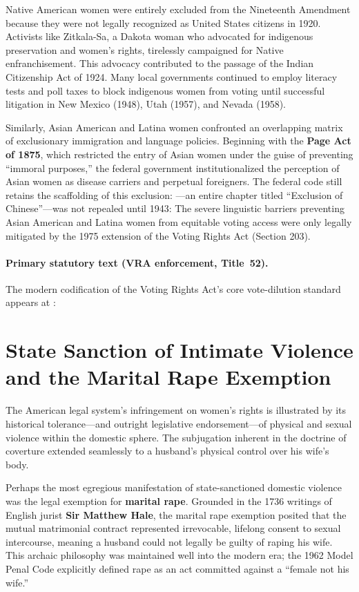 Native American women were entirely excluded from the Nineteenth Amendment because they were not legally recognized as United States citizens in 1920. Activists like Zitkala-Sa, a Dakota woman who advocated for indigenous preservation and women's rights, tirelessly campaigned for Native enfranchisement. This advocacy contributed to the passage of the Indian Citizenship Act of 1924. Many local governments continued to employ literacy tests and poll taxes to block indigenous women from voting until successful litigation in New Mexico (1948), Utah (1957), and Nevada (1958).

Similarly, Asian American and Latina women confronted an overlapping matrix of exclusionary immigration and language policies. Beginning with the \textbf{Page Act of 1875}, which restricted the entry of Asian women under the guise of preventing ``immoral purposes,'' the federal government institutionalized the perception of Asian women as disease carriers and perpetual foreigners. The federal code still retains the scaffolding of this exclusion: ---an entire chapter titled ``Exclusion of Chinese''---was not repealed until 1943:
The severe linguistic barriers preventing Asian American and Latina women from equitable voting access were only legally mitigated by the 1975 extension of the Voting Rights Act (Section 203).

\paragraph{Primary statutory text (VRA enforcement, Title~52).}
The modern codification of the Voting Rights Act's core vote-dilution standard appears at :

\section{State Sanction of Intimate Violence and the Marital Rape Exemption}

The American legal system’s infringement on women's rights is illustrated by its historical tolerance---and outright legislative endorsement---of physical and sexual violence within the domestic sphere. The subjugation inherent in the doctrine of coverture extended seamlessly to a husband’s physical control over his wife's body. 

Perhaps the most egregious manifestation of state-sanctioned domestic violence was the legal exemption for \textbf{marital rape}. Grounded in the 1736 writings of English jurist \textbf{Sir Matthew Hale}, the marital rape exemption posited that the mutual matrimonial contract represented irrevocable, lifelong consent to sexual intercourse, meaning a husband could not legally be guilty of raping his wife. This archaic philosophy was maintained well into the modern era; the 1962 Model Penal Code explicitly defined rape as an act committed against a ``female not his wife.''

